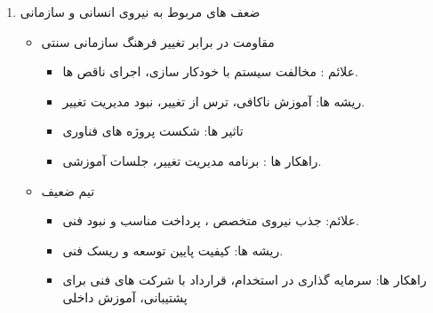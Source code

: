 \documentclass[12pt,a4paper]{report}
\begin{document}
\begin{enumerate}
\begin{itemize}
\begin{itemize}
	\end{itemize}
\end{itemize}
\item ضعف های مربوط به نیروی انسانی و سازمانی 
\begin{itemize}
	\item مقاومت در برابر تغییر فرهنگ سازمانی سنتی  
	\begin{itemize}
		\item  علائم : 
مخالفت سیستم با خودکار سازی، اجرای ناقص  ها.
		\item ریشه ها:
آموزش ناکافی، ترس از تغییر، نبود مدیریت تغییر.
		\item تاثیر ها:
شکست پروژه های فناوری
		\item راهکار ها :
برنامه مدیریت تغییر، جلسات آموزشی.
	\end{itemize}
		\item تیم  ضعیف
	\begin{itemize}
		\item  علائم:
		جذب نیروی متخصص ، پرداخت مناسب و نبود  فنی.
		\item ریشه ها:
کیفیت پایین توسعه و ریسک فنی.
		\item راهکار ها:
سرمایه گذاری در استخدام، قرارداد با شرکت های فنی برای پشتیبانی، آموزش داخلی
	\end{itemize}


\end{itemize}
\end{enumerate}
\end{document}
